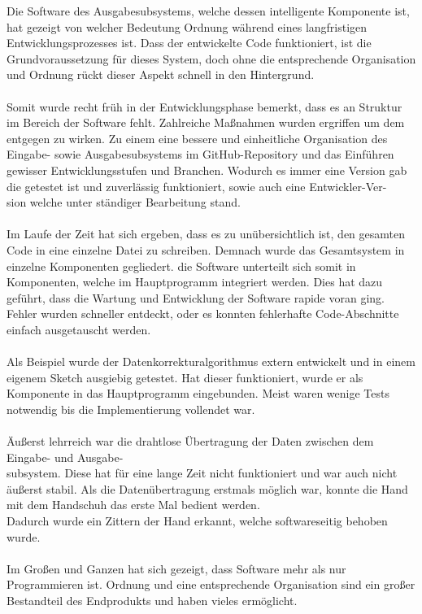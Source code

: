 \documentclass[titlepage,12pt,twoside]{article}
\begin{document}
Die Software des Ausgabesubsystems, welche dessen intelligente Komponente ist, 
hat gezeigt von welcher Bedeutung Ordnung während eines langfristigen Entwicklungsprozesses ist. 
Dass der entwickelte Code funktioniert, ist die Grundvoraussetzung für dieses System, 
doch ohne die entsprechende Organisation und Ordnung rückt dieser Aspekt schnell 
in den Hintergrund. \\
\\
Somit wurde recht früh in der Entwicklungsphase bemerkt, dass es an Struktur 
im Bereich der Software fehlt. Zahlreiche Maßnahmen wurden ergriffen um dem 
entgegen zu wirken. Zu einem eine bessere und einheitliche Organisation des Eingabe- sowie 
Ausgabesubsystems im GitHub-Repository und das Einführen gewisser Entwicklungsstufen und Branchen. 
Wodurch es immer eine Version gab die getestet ist und zuverlässig funktioniert, sowie auch eine 
Entwickler-Ver-\\sion welche unter ständiger Bearbeitung stand. \\
\\
Im Laufe der Zeit hat sich ergeben, dass es zu unübersichtlich ist, den gesamten Code in eine einzelne
Datei zu schreiben. Demnach wurde das Gesamtsystem in einzelne Komponenten gegliedert. 
die Software unterteilt sich somit in Komponenten, welche im Hauptprogramm integriert werden.
Dies hat dazu geführt, dass die Wartung und Entwicklung der Software rapide voran ging.
Fehler wurden schneller entdeckt, oder es konnten fehlerhafte Code-Abschnitte einfach ausgetauscht werden. \\
\\
Als Beispiel wurde der Datenkorrekturalgorithmus extern entwickelt und in einem eigenem Sketch ausgiebig getestet.
Hat dieser funktioniert, wurde er als Komponente in das Hauptprogramm eingebunden.
Meist waren wenige Tests notwendig bis die Implementierung vollendet war. \\
\\
Äußerst lehrreich war die drahtlose Übertragung der Daten zwischen dem Eingabe- und Ausgabe-\\subsystem.
Diese hat für eine lange Zeit nicht funktioniert und war auch nicht äußerst stabil. 
Als die Datenübertragung erstmals möglich war, konnte die Hand mit dem Handschuh
das erste Mal bedient werden. \\
Dadurch wurde ein Zittern der Hand erkannt, welche softwareseitig behoben wurde. \\
\\
Im Großen und Ganzen hat sich gezeigt, dass Software mehr als nur Programmieren ist. Ordnung 
und eine entsprechende Organisation sind ein großer Bestandteil des Endprodukts und
haben vieles ermöglicht. \\
\\
\end{document}
